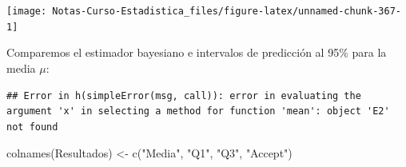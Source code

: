 \documentclass[
  12pt,
]{book}
\newenvironment{Shaded}{\begin{snugshade}}{\end{snugshade}}
\newcommand{\AttributeTok}[1]{\textcolor[rgb]{0.77,0.63,0.00}{#1}}
\newcommand{\ConstantTok}[1]{\textcolor[rgb]{0.00,0.00,0.00}{#1}}
\newcommand{\DecValTok}[1]{\textcolor[rgb]{0.00,0.00,0.81}{#1}}
\newcommand{\FloatTok}[1]{\textcolor[rgb]{0.00,0.00,0.81}{#1}}
\newcommand{\FunctionTok}[1]{\textcolor[rgb]{0.00,0.00,0.00}{#1}}
\newcommand{\NormalTok}[1]{#1}
\newcommand{\OtherTok}[1]{\textcolor[rgb]{0.56,0.35,0.01}{#1}}
\newcommand{\SpecialCharTok}[1]{\textcolor[rgb]{0.00,0.00,0.00}{#1}}
\newcommand{\StringTok}[1]{\textcolor[rgb]{0.31,0.60,0.02}{#1}}
\theoremstyle{definition}
\theoremstyle{definition}
\theoremstyle{definition}
\theoremstyle{definition}
\theoremstyle{remark}
\begin{document}
\begin{center}\texttt{[image: Notas-Curso-Estadistica\_files/figure-latex/unnamed-chunk-367-1]} \end{center}

Comparemos el estimador bayesiano e intervalos de predicción al 95\% para la media \(\mu\):

\begin{Shaded}
\end{Shaded}

\begin{verbatim}
## Error in h(simpleError(msg, call)): error in evaluating the argument 'x' in selecting a method for function 'mean': object 'E2' not found
\end{verbatim}

\begin{Shaded}
\begin{Highlighting}[]
\FunctionTok{colnames}\NormalTok{(Resultados) }\OtherTok{\textless{}{-}} \FunctionTok{c}\NormalTok{(}\StringTok{"Media"}\NormalTok{, }\StringTok{"Q1"}\NormalTok{, }\StringTok{"Q3"}\NormalTok{, }\StringTok{"Accept"}\NormalTok{)}
\end{Highlighting}
\end{Shaded}
\end{document}
